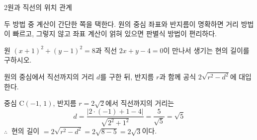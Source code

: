 \documentclass[10pt]{article}
\begin{document}
\begin{dmconcept}{2}{원과 직선의 위치 관계}
\begin{dmnote}
두 방법 중 계산이 간단한 쪽을 택한다. 원의 중심 좌표와 반지름이 명확하면 거리 방법이 빠르고, 그렇지 않고 좌표 계산이 얽혀 있으면 판별식 방법이 편리하다.
\end{dmnote}

\vspace{60.0mm}%
\end{dmconcept}

\newpage


\begin{dmproblem}
원 $(x + 1)^2 + (y - 1)^2 = 8$과 직선 $2x + y - 4 = 0$이 만나서 생기는 현의 길이를 구하시오.
\end{dmproblem}

\begin{dmapproach}
원의 중심에서 직선까지의 거리 $d$를 구한 뒤, 반지름 $r$과 함께 공식 $2\sqrt{r^2 - d^2}$에 대입한다.
\end{dmapproach}

\begin{dmsolution}
중심 $\mathrm{C}(-1,\, 1)$, 반지름 $r = 2\sqrt{2}$에서 직선까지의 거리는
\begin{equation*}
  d = \frac{|2 \cdot (-1) + 1 - 4|}{\sqrt{2^2 + 1^2}} = \frac{5}{\sqrt{5}} = \sqrt{5}
\end{equation*}
$\therefore\ $ 현의 길이 $= 2\sqrt{r^2 - d^2} = 2\sqrt{8 - 5} = 2\sqrt{3}$이다.
\end{dmsolution}

\dmchecktitle



\newpage

\end{document}
